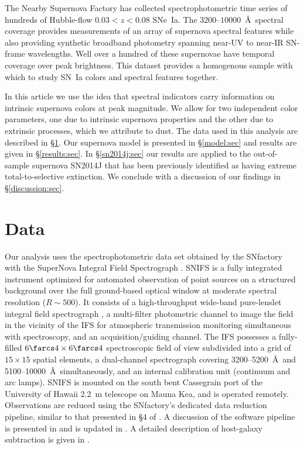 \documentclass{aastex61}   	%
\begin{document}
The Nearby Supernova Factory \citep[SNfactory;][]{2004SPIE.5249..146L} has collected  
spectrophotometric time series of hundreds of Hubble-flow $0.03<z<0.08$ SNe~Ia.   The $3200$--$10000$~\AA\ spectral coverage
provides measurements of an array of supernova spectral features while also providing synthetic broadband photometry
spanning near-UV to near-IR SN-frame wavelengths.  Well over a hundred of these supernovae have temporal coverage over
peak brightness.  This dataset provides a homogenous sample with which to study SN~Ia colors and spectral features together.

In this article we use the idea that spectral indicators carry information on intrinsic supernova colors at peak magnitude.
We allow for two independent color parameters, one due to intrinsic supernova
properties and the other due to
extrinsic processes, which we attribute to dust.  The data used in this analysis are described in \S\ref{data:sec}.  Our supernova model is presented in
\S\ref{model:sec} and results are given in \S\ref{results:sec}.  In \S\ref{sn2014j:sec} our results are applied to the out-of-sample
supernova SN2014J that has been previously identified as having extreme total-to-selective extinction.
We conclude with a discussion of our findings in \S\ref{discussion:sec}.


\section{Data}
\label{data:sec}

Our analysis uses the spectrophotometric data set obtained by
the SNfactory with the SuperNova Integral Field
Spectrograph \citep[SNIFS,][]{2004SPIE.5249..146L}.  SNIFS is a fully integrated
instrument optimized for automated observation of point sources on a
structured background over the full ground-based optical window at
moderate spectral resolution ($R \sim 500$).  It consists of a
high-throughput wide-band pure-lenslet integral field spectrograph
\citep[IFS, ``\`a la TIGER;''][]{1995A&AS..113..347B,2000ASPC..195..173B,2001MNRAS.326...23B}, a
multi-filter photometric channel to image the field in the vicinity of
the IFS for atmospheric transmission monitoring simultaneous with
spectroscopy, and an acquisition/guiding channel.  The IFS possesses a
fully-filled $6\farcs 4 \times 6\farcs 4$ spectroscopic field of view
subdivided into a grid of $15 \times 15$ spatial elements, a
dual-channel spectrograph covering 3200--5200~\AA\ and 5100--10000~\AA\
simultaneously, and an internal calibration unit (continuum and arc
lamps).  SNIFS is mounted on the south bent Cassegrain port of the
University of Hawaii 2.2~m telescope on Mauna Kea, and is operated
remotely.  Observations are reduced using the SNfactory's dedicated data
reduction pipeline, similar to that presented in \S4 of \citet{2001MNRAS.326...23B}.
A discussion of the software pipeline is presented in
\citet{2006ApJ...650..510A} and is updated in \citet{2010ApJ...713.1073S}.  A detailed
description of host-galaxy subtraction is given in \citet{2011MNRAS.418..258B}.
\end{document}
